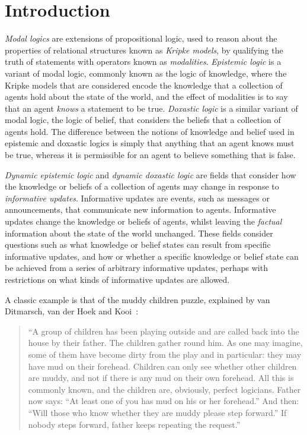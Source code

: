 \chapter{Introduction}


{\em Modal logics} are extensions of propositional logic, used to reason about
the properties of relational structures known as {\em Kripke models}, by
qualifying the truth of statements with operators known as {\em modalities}.
{\em Epistemic logic} is a variant of modal logic, commonly known as the logic
of knowledge, where the Kripke models that are considered encode the knowledge
that a collection of agents hold about the state of the world, and the effect of
modalities is to say that an agent {\em knows} a statement to be true. {\em
Doxastic logic} is a similar variant of modal logic, the logic of belief, that
considers the beliefs that a collection of agents hold. The difference between
the notions of knowledge and belief used in epistemic and doxastic logics is
simply that anything that an agent knows must be true, whereas it is permissible
for an agent to believe something that is false.

{\em Dynamic epistemic logic} and {\em dynamic doxastic logic} are fields that
consider how the knowledge or beliefs of a collection of agents may change in
response to {\em informative updates}. Informative updates are events, such as
messages or announcements, that communicate new information to agents. 
Informative updates change the knowledge or beliefs of agents, whilst leaving
the {\em factual} information about the state of the world unchanged.  These
fields consider questions such as what knowledge or belief states can result
from specific informative updates, and how or whether a specific knowledge or
belief state can be achieved from a series of arbitrary informative updates,
perhaps with restrictions on what kinds of informative updates are allowed.

A classic example is that of the muddy children puzzle, explained by van
Ditmarsch, van der Hoek and Kooi~\cite{vanditmarsch2007dynamic}:

\begin{quote}
``A group of children has been playing outside and are called back into the house
by their father. The children gather round him. As one may imagine, some of them
have become dirty from the play and in particular: they may have mud on their
forehead. Children can only see whether other children are muddy, and not if
there is any mud on their own forehead. All this is commonly known, and the
children are, obviously, perfect logicians. Father now says: “At least one of
you has mud on his or her forehead.” And then: “Will those who know whether they
are muddy please step forward.” If nobody steps forward, father keeps repeating
the request.''
\end{quote}

